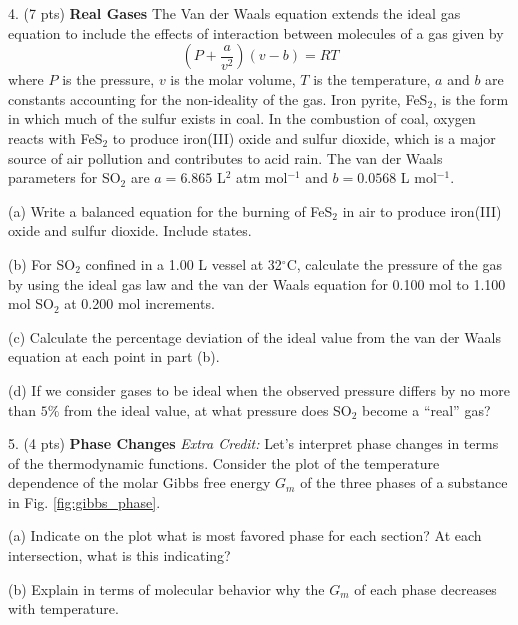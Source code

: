 \documentclass[11pt]{article}
\begin{document}
\pagebreak

4. (7 pts) \textbf{Real Gases} The Van der Waals equation extends the ideal gas equation to
include the effects of interaction between molecules of a gas given by
\begin{equation}
  (P+\frac{a}{v^2})(v - b) = RT
  \label{eqn:van_der}
\end{equation}
where $P$ is the pressure, $v$ is the molar volume, $T$ is the temperature, $a$ and $b$
are constants accounting for the non-ideality of the gas. Iron pyrite, FeS$_2$, is the
form in which much of the sulfur exists in coal. In the combustion of coal, oxygen reacts
with FeS$_2$ to produce iron(III) oxide and sulfur dioxide, which is a major source of air
pollution and contributes to acid rain. The van der Waals parameters for SO$_2$ are
$a = 6.865$ L$^2$ atm mol$^{-1}$ and $b = 0.0568$ L mol$^{-1}$.

(a) Write a balanced equation for the burning of FeS$_2$ in air to produce iron(III)
oxide and sulfur dioxide. Include states.

(b) For SO$_2$ confined in a 1.00 L vessel at 32$^\circ$C, calculate the pressure of the gas
by using the ideal gas law and the van der Waals equation for 0.100 mol to 1.100 mol SO$_2$ at
0.200 mol increments.

(c) Calculate the percentage deviation of the ideal value from the van der Waals equation at
each point in part (b).

(d) If we consider gases to be ideal when the observed pressure differs by no more than $5\%$
from the ideal value, at what pressure does SO$_2$ become a ``real'' gas?

\pagebreak



5. (4 pts) \textbf{Phase Changes} \textit{Extra Credit:} Let's interpret phase changes in terms
of the thermodynamic functions. Consider the plot of the temperature dependence of the molar
Gibbs free energy $G_m$ of the three phases of a substance in Fig. \ref{fig:gibbs_phase}.

(a) Indicate on the plot what is most favored phase for each section? At each intersection,
what is this indicating?

(b) Explain in terms of molecular behavior why the $G_m$ of each phase decreases with temperature.
\end{document}
